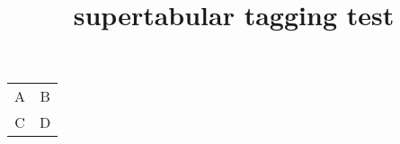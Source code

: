 \documentclass{article}
\title{supertabular tagging test}
\begin{document}
\begin{supertabular}{cc}
A & B \\
C & D \\
\end{supertabular} 
\end{document}
